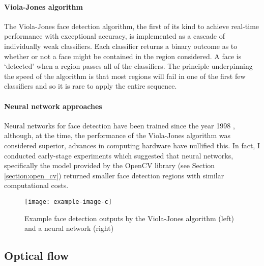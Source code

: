 \paragraph{Viola-Jones algorithm} 
The Viola-Jones face detection algorithm\cite{Viola2004}, the first of its kind to achieve real-time performance with exceptional accuracy, is implemented as a cascade of 
individually weak classifiers. Each classifier returns a binary outcome as to whether or not a face might be contained in the region considered.
A face is `detected' when a region passes all of the classifiers. The principle underpinning the speed of the algorithm is that most regions will fail in one of the first few classifiers
and so it is rare to apply the entire sequence.



\paragraph{Neural network approaches}
Neural networks for face detection have been trained since the year 1998 \cite{655647}, although, at the time, the performance of the Viola-Jones algorithm was considered superior, advances in 
computing hardware have nullified this. In fact, I conducted early-stage experiments which suggested that neural networks, specifically the model provided by the OpenCV library (see 
Section \ref{section:open_cv}) returned smaller face detection regions with similar computational costs.


\begin{figure}[H]
    \texttt{[image: example-image-c]}
   \caption{Example face detection outputs by the Viola-Jones algorithm (left) and a neural network (right) } 
   \label{fig:face_det_example}
\end{figure}

\subsection{Optical flow}

